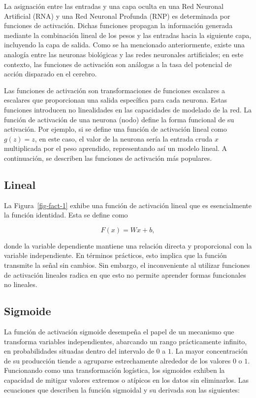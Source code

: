 \documentclass[
  us-letterpaper,
]{scrreprt}
\theoremstyle{plain}
\theoremstyle{definition}
\theoremstyle{plain}
\theoremstyle{definition}
\theoremstyle{remark}
\begin{document}
La asignación entre las entradas y una capa oculta en una Red Neuronal
Artificial (RNA) y una Red Neuronal Profunda (RNP) es determinada por
funciones de activación. Dichas funciones propagan la información
generada mediante la combinación lineal de los pesos y las entradas
hacia la siguiente capa, incluyendo la capa de salida. Como se ha
mencionado anteriormente, existe una analogía entre las neuronas
biológicas y las redes neuronales artificiales; en este contexto, las
funciones de activación son análogas a la tasa del potencial de acción
disparado en el cerebro.

Las funciones de activación son transformaciones de funciones escalares
a escalares que proporcionan una salida específica para cada neurona.
Estas funciones introducen no linealidades en las capacidades de
modelado de la red. La función de activación de una neurona (nodo)
define la forma funcional de su activación. Por ejemplo, si se define
una función de activación lineal como \(g(z) = z\), en este caso, el
valor de la neurona sería la entrada cruda \(x\) multiplicada por el
peso aprendido, representando así un modelo lineal. A continuación, se
describen las funciones de activación más populares.

\subsection{Lineal}\label{lineal}

La Figura~\ref{fig-fact-1} exhibe una función de activación lineal que
es esencialmente la función identidad. Esta se define como

\[
F(x)=Wx + b,
\]

donde la variable dependiente mantiene una relación directa y
proporcional con la variable independiente. En términos prácticos, esto
implica que la función transmite la señal sin cambios. Sin embargo, el
inconveniente al utilizar funciones de activación lineales radica en que
esto no permite aprender formas funcionales no lineales.

\subsection{Sigmoide}\label{sigmoide}

La función de activación sigmoide desempeña el papel de un mecanismo que
transforma variables independientes, abarcando un rango prácticamente
infinito, en probabilidades situadas dentro del intervalo de \(0\) a
\(1\). La mayor concentración de su producción tiende a agruparse
estrechamente alrededor de los valores \(0\) o \(1\). Funcionando como
una transformación logística, los sigmoides exhiben la capacidad de
mitigar valores extremos o atípicos en los datos sin eliminarlos. Las
ecuaciones que describen la función sigmoidal y su derivada son las
siguientes:
\end{document}
